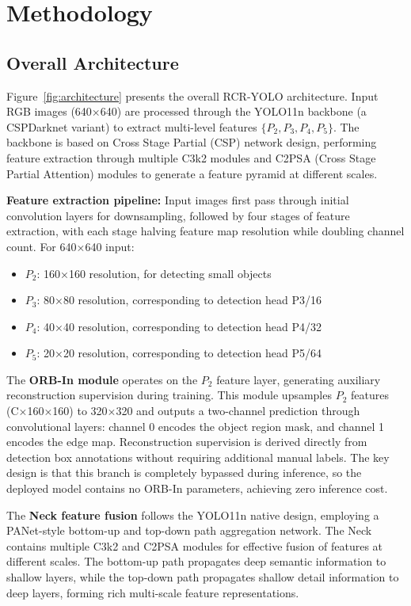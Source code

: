 \documentclass[journal]{IEEEtran}
\begin{document}
\section{Methodology}
\label{sec:methodology}

\subsection{Overall Architecture}

Figure~\ref{fig:architecture} presents the overall RCR-YOLO architecture. Input RGB images (640×640) are processed through the YOLO11n backbone (a CSPDarknet variant) to extract multi-level features $\{P_2, P_3, P_4, P_5\}$. The backbone is based on Cross Stage Partial (CSP) network design, performing feature extraction through multiple C3k2 modules and C2PSA (Cross Stage Partial Attention) modules to generate a feature pyramid at different scales.

\textbf{Feature extraction pipeline:} Input images first pass through initial convolution layers for downsampling, followed by four stages of feature extraction, with each stage halving feature map resolution while doubling channel count. For 640×640 input:
\begin{itemize}
    \item $P_2$: 160×160 resolution, for detecting small objects
    \item $P_3$: 80×80 resolution, corresponding to detection head P3/16
    \item $P_4$: 40×40 resolution, corresponding to detection head P4/32
    \item $P_5$: 20×20 resolution, corresponding to detection head P5/64
\end{itemize}

The \textbf{ORB-In module} operates on the $P_2$ feature layer, generating auxiliary reconstruction supervision during training. This module upsamples $P_2$ features (C×160×160) to 320×320 and outputs a two-channel prediction through convolutional layers: channel 0 encodes the object region mask, and channel 1 encodes the edge map. Reconstruction supervision is derived directly from detection box annotations without requiring additional manual labels. The key design is that this branch is completely bypassed during inference, so the deployed model contains no ORB-In parameters, achieving zero inference cost.

The \textbf{Neck feature fusion} follows the YOLO11n native design, employing a PANet-style bottom-up and top-down path aggregation network. The Neck contains multiple C3k2 and C2PSA modules for effective fusion of features at different scales. The bottom-up path propagates deep semantic information to shallow layers, while the top-down path propagates shallow detail information to deep layers, forming rich multi-scale feature representations.
\end{document}
